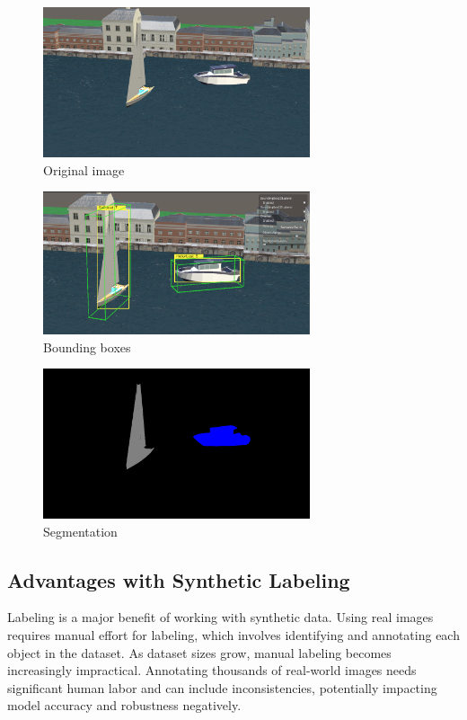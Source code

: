 \begin{figure}[H]
    \centering
    \includegraphics[width=0.7\textwidth]{Figures/rgb_2.png}
    \caption{Original image}
    \label{fig:image1}
\end{figure}

\begin{figure}[H]
    \centering
    \includegraphics[width=0.7\textwidth]{Figures/boundingbox.png}
    \caption{Bounding boxes}
    \label{fig:image2}
\end{figure}

\begin{figure}[H]
    \centering
    \includegraphics[width=0.7\textwidth]{Figures/segmentation_2.png}
    \caption{Segmentation}
    \label{fig:image3}
\end{figure}




\subsection{Advantages with Synthetic Labeling}
Labeling is a major benefit of working with synthetic data. Using real images requires manual effort for labeling, which involves identifying and annotating each object in the dataset. As dataset sizes grow, manual labeling becomes increasingly impractical. Annotating thousands of real-world images needs significant human labor and can include inconsistencies, potentially impacting model accuracy and robustness negatively. \cite{nikolenko2021synthetic}

